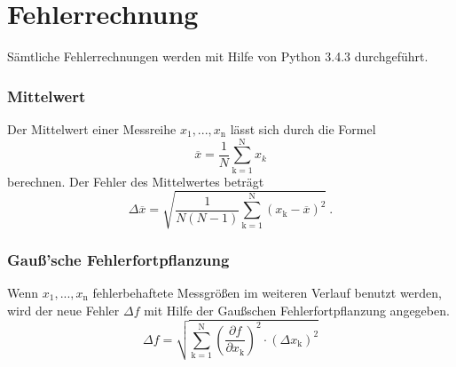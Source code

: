 \section{Fehlerrechnung}
Sämtliche Fehlerrechnungen werden mit Hilfe von Python 3.4.3 durchgeführt.
\subsubsection{Mittelwert}
Der Mittelwert einer Messreihe $x_\text{1}, ... ,x_\text{n}$ lässt sich durch die Formel
\begin{equation}
	\overline{x} = \frac{1}{N} \sum_{\text{k}=1}^\text{N} x_k
	\label{eqn:ave}
\end{equation}
berechnen. Der Fehler des Mittelwertes beträgt
\begin{equation}
	\Delta \overline{x} = \sqrt{ \frac{1}{N(N-1)} \sum_{\text{k}=1}^\text{N} (x_\text{k} - \overline{x})^2} \ .
	\label{eqn:std}
\end{equation}

\subsubsection{Gauß'sche Fehlerfortpflanzung}
Wenn $x_\text{1}, ..., x_\text{n}$ fehlerbehaftete Messgrößen im weiteren Verlauf benutzt werden, wird der neue Fehler $\Delta f$ mit Hilfe der Gaußschen Fehlerfortpflanzung angegeben.
\begin{equation}
	\Delta f = \sqrt{\sum_{\text{k}=1}^\text{N} \left( \frac{ \partial f}{\partial x_\text{k}} \right) ^2 \cdot (\Delta x_\text{k})^2}
	\label{eqn:var}
\end{equation}

